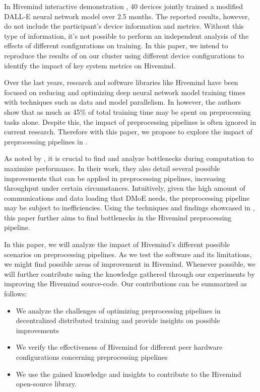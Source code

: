 In Hivemind interactive demonstration \cite{hivemind}, 40 devices jointly trained a modified DALL-E \cite{ramesh2021zero} neural network model over 2.5 months.
The reported results, however, do not include the participant's device information and metrics.
Without this type of information, it's not possible to perform an independent analysis of the effects of different configurations on training.
In this paper, we intend to reproduce the results of \cite{hivemind} on our cluster using different device configurations to identify the impact of key system metrics on Hivemind.

Over the last years, research and software libraries like Hivemind have been focused on reducing and optimizing deep neural network model training times with techniques such as data and model parallelism.
In \cite{xin2021production} however, the authors show that as much as 45\% of total training time may be spent on preprocessing tasks alone.
Despite this, the impact of preprocessing pipelines is often ignored in current research.
Therefore with this paper, we propose to explore the impact of preprocessing pipelines in \cite{hivemind}.

As noted by \cite{isenko2022bottleneck}, it is crucial to find and analyze bottlenecks during computation to maximize performance.
In their work, they also detail several possible improvements that can be applied in preprocessing pipelines, increasing throughput under certain circumstances.
Intuitively, given the high amount of communications and data loading that DMoE needs, the preprocessing pipeline may be subject to inefficiencies.
Using the techniques and findings showcased in \cite{isenko2022bottleneck}, this paper further aims to find bottlenecks in the Hivemind preprocessing pipeline.

In this paper, we will analyze the impact of Hivemind's different possible scenarios on preprocessing pipelines.
As we test the software and its limitations, we might find possible areas of improvement in Hivemind.
Whenever possible, we will further contribute using the knowledge gathered through our experiments by improving the Hivemind \cite{hivemind} source-code.
Our contributions can be summarized as follows:
\begin{itemize}
    \item We analyze the challenges of optimizing preprocessing pipelines in decentralized distributed training and provide insights on possible improvements
    \item We verify the effectiveness of Hivemind for different peer hardware configurations concerning preprocessing pipelines
    \item We use the gained knowledge and insights to contribute to the Hivemind open-source library.
\end{itemize}
